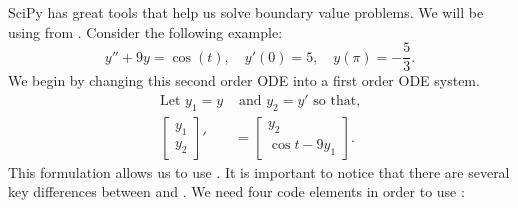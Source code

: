 SciPy has great tools that help us solve boundary value problems.
We will be using  from .
Consider the following example:
\begin{equation}
    y'' + 9y = \cos(t),\quad
    y'(0) = 5, \quad
    y\left(\pi\right) = -\frac{5}{3}.
\end{equation}
We begin by changing this second order ODE into a first order ODE system.
\begin{align*}
    \text{Let } y_1 = y &\text{ and } y_2 = y' \text{ so that,}\\
    \begin{bmatrix}
        y_1\\y_2
    \end{bmatrix}'
    &=
    \begin{bmatrix}
        y_2 \\
        \cos{t} - 9y_1
    \end{bmatrix}.
\end{align*}
This formulation allows us to use .
It is important to notice that there are several key differences between  and .
We need four code elements in order to use :
